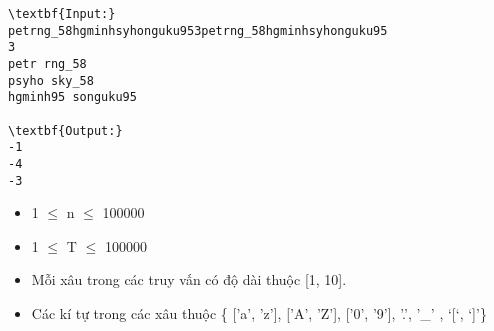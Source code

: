 \begin{verbatim}
\textbf{Input:}
petrng_58hgminhsyhonguku953petrng_58hgminhsyhonguku95
3
petr rng_58
psyho sky_58
hgminh95 songuku95

\textbf{Output:}
-1
-4
-3

\end{verbatim}
\begin{itemize}
	\item        1  $\le$  n  $\le$  100000      
	\item          1  $\le$  T  $\le$  100000        
	\item            Mỗi xâu trong các truy vấn có độ dài thuộc [1, 10].          
	\item              Các kí tự trong các xâu thuộc \{ ['a', 'z'], ['A', 'Z'], ['0', '9'], '.', '\_' , ‘[‘, ‘]’\}            
\end{itemize}